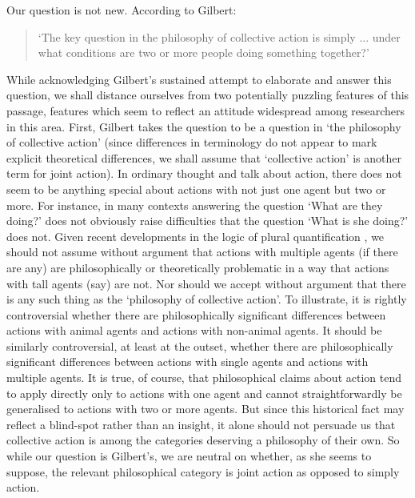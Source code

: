 \documentclass[12pt,a4paper]{extarticle}
\begin{document}
Our question is not new.
According to Gilbert:
%
\begin{quote}
`The key question in the philosophy of collective action is simply ... under what conditions are two or more people doing something together?' \citep[p.\ 67]{Gilbert:2010fk}
\end{quote}
%
While acknowledging Gilbert's sustained attempt to elaborate and answer this question, we shall distance ourselves from two potentially puzzling features of this passage, features which seem to reflect an attitude widespread among researchers in this area.
First, Gilbert takes the question to be a question in `the philosophy of collective action' (since differences in terminology do not appear to mark explicit theoretical differences, we shall assume that `collective action' is another term for joint action).
In ordinary thought and talk about action, there does not seem to be anything special about actions with not just one agent but two or more.
For instance, in many contexts answering the question `What are they doing?' does not obviously raise difficulties that the question `What is she doing?' does not.
Given recent developments in the logic of plural quantification \citep[see][for an overview]{Linnebo:2005ig}, we should not assume without argument that actions with multiple agents (if there are any) are philosophically or theoretically problematic in a way that actions with tall agents (say) are not.
Nor should we accept without argument that there is any such thing as the `philosophy of collective action'.
To illustrate, it is rightly controversial whether there are philosophically significant differences between actions with animal agents and actions with non-animal agents.
It should be similarly controversial, at least at the outset, whether there are philosophically significant differences between actions with single agents and actions with multiple agents.
It is true, of course, that philosophical claims about action tend to apply directly only to actions with one agent and cannot straightforwardly be generalised to actions with two or more agents.  
But since this historical fact may reflect a blind-spot rather than an insight, it alone should not persuade us that collective action is among the categories deserving a philosophy of their own.
So while our question is Gilbert's, we are neutral on whether, as she seems to suppose, the relevant philosophical category is joint action as opposed to simply action.
\end{document}
